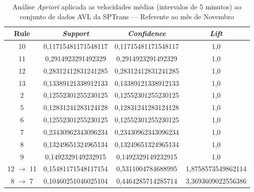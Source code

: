 \documentclass[
	12pt,				%
	oneside,			%
	a4paper,			%
	english,			%
	brazil				%
	]{abntex2ppgsi}
\begin{document}
{{\begin{apendicesenv}
\begin{table}[!htb]
\centering
\caption {Análise \textit{Apriori} aplicada as velocidades médias (intervalos de 5 minutos) ao conjunto de dados AVL da SPTrans --- Referente ao mês de Novembro}
\label {tab:aprioriNovember}
\begin{tabular}{c|c|c|c}
\hline
\textbf{Rule} & \textit{\textbf{Support}} & \textit{\textbf{Confidence}} & \textit{\textbf{Lift}} \\
\hline
10 &  0,11715481171548117 &  0,11715481171548117 &  1,0\\
\hline
11 &  0,2914923291492329 &  0,2914923291492329 &  1,0\\
\hline
12 &  0,28312412831241285 &  0,28312412831241285 &  1,0\\
\hline
13 &  0,13389121338912133 &  0,13389121338912133 &  1,0\\
\hline
2 &  0,12552301255230125 &  0,12552301255230125 &  1,0\\
\hline
5 &  0,12831241283124128 &  0,12831241283124128 &  1,0\\
\hline
6 &  0,12552301255230125 &  0,12552301255230125 &  1,0\\
\hline
7 &  0,23430962343096234 &  0,23430962343096234 &  1,0\\
\hline
8 &  0,13249651324965134 &  0,13249651324965134 &  1,0\\
\hline
9 &  0,1492329149232915 &  0,1492329149232915 &  1,0\\
\hline
12 $\rightarrow$ 11 &  0,15481171548117154 &  0,5311004784688995 &  1,8758573549862114\\
\hline
8 $\rightarrow$ 7 &  0,10460251046025104 &  0,4464285714285714 &  3,3693609022556386\\
\hline
\end{tabular}
\end{table}



\end{apendicesenv}}}
\end{document}
